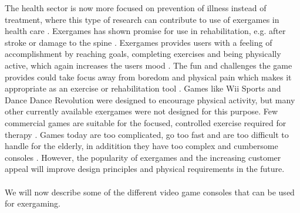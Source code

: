 The health sector is now more focused on prevention of illness instead of treatment, where this type of research can contribute to use of exergames in health care \cite{gamingforhealth}. Exergames has shown promise for use in rehabilitation, e.g. after stroke or damage to the spine \cite{lange2011development}. Exergames provides users with a feeling of accomplishment by reaching goals, completing exercises and being physically active, which again increases the users mood \cite{staiano2011exergames}. The fun and challenges the game provides could take focus away from boredom and physical pain which makes it appropriate as an exercise or rehabilitation tool \cite{exergamesforelderly}. Games like Wii Sports and Dance Dance Revolution were designed to encourage physical activity, but many other currently available exergames were not designed for this purpose. Few commercial games are suitable for the focused, controlled exercise required for therapy \cite{lange2011development}. Games today are too complicated, go too fast and are too difficult to handle for the elderly, in additition they have too complex and cumbersome consoles \cite{exergamesforelderly}. However, the popularity of exergames and the increasing customer appeal will improve design principles and physical requirements in the future\cite{chamberlin2008exergames}. \\ \\
We will now describe some of the different video game consoles that can be used for exergaming.
